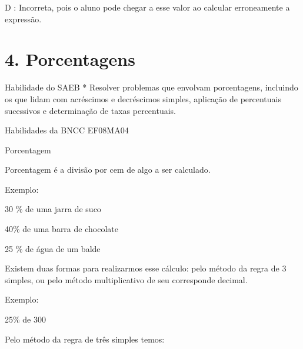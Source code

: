 D : Incorreta, pois o aluno pode chegar a esse valor ao calcular
erroneamente a expressão.


\section{4. Porcentagens}

Habilidade do SAEB * Resolver problemas que envolvam porcentagens,
incluindo os que lidam com acréscimos e decréscimos simples, aplicação
de percentuais sucessivos e determinação de taxas percentuais.

Habilidades da BNCC EF08MA04

Porcentagem

Porcentagem é a divisão por cem de algo a ser calculado.

Exemplo:

30 \% de uma jarra de suco

40\% de uma barra de chocolate

25 \% de água de um balde

Existem duas formas para realizarmos esse cálculo: pelo método da regra
de 3 simples, ou pelo método multiplicativo de seu corresponde decimal.

Exemplo:

25\% de 300

Pelo método da regra de três simples temos:

